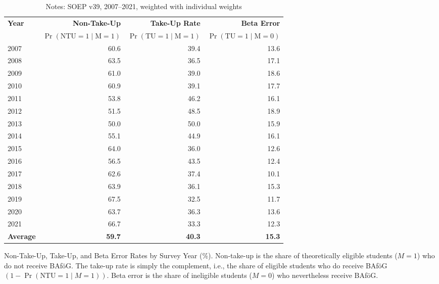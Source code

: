 \begin{table}[htbp]
\centering
\begin{tabular}{l@{\hspace{2em}}r@{\hspace{2em}}r@{\hspace{2em}}r}
\toprule
\textbf{Year} & \textbf{Non-Take-Up} & \textbf{Take-Up Rate} & \textbf{Beta Error} \\
              & \(\Pr(\text{NTU} = 1 \mid \text{M} = 1)\) & \(\Pr(\text{TU} = 1 \mid \text{M} = 1)\) & \(\Pr(\text{TU} = 1 \mid \text{M} = 0)\) \\
\midrule
2007 & 60.6 & 39.4 & 13.6 \\
2008 & 63.5 & 36.5 & 17.1 \\
2009 & 61.0 & 39.0 & 18.6 \\
2010 & 60.9 & 39.1 & 17.7 \\
2011 & 53.8 & 46.2 & 16.1 \\
2012 & 51.5 & 48.5 & 18.9 \\
2013 & 50.0 & 50.0 & 15.9 \\
2014 & 55.1 & 44.9 & 16.1 \\
2015 & 64.0 & 36.0 & 12.6 \\
2016 & 56.5 & 43.5 & 12.4 \\
2017 & 62.6 & 37.4 & 10.1 \\
2018 & 63.9 & 36.1 & 15.3 \\
2019 & 67.5 & 32.5 & 11.7 \\
2020 & 63.7 & 36.3 & 13.6 \\
2021 & 66.7 & 33.3 & 12.3 \\
\midrule
\textbf{Average} & \textbf{59.7} & \textbf{40.3} & \textbf{15.3} \\
\bottomrule
\end{tabular}
\caption{Non-Take-Up, Take-Up, and Beta Error Rates by Survey Year (\%). Non-take-up is the share of theoretically eligible students (\(M=1\)) who do not receive BAföG. The take-up rate is simply the complement, i.e., the share of eligible students who do receive BAföG \((1 - \Pr(\text{NTU} = 1 \mid M = 1))\). Beta error is the share of ineligible students (\(M=0\)) who nevertheless receive BAföG.}
\caption*{\small{Notes: SOEP v39, 2007--2021, weighted with individual weights}}
\label{table:microsimulation-ntu}
\end{table}
